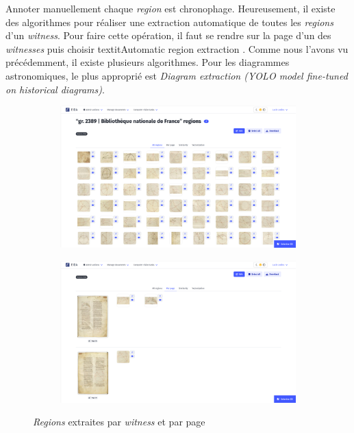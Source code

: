 Annoter manuellement chaque \textit{region} est chronophage. Heureusement, il existe des algorithmes pour réaliser une extraction automatique de toutes les \textit{regions} d'un \textit{witness}. 
Pour faire cette opération, il faut se rendre sur la page d'un des \textit{witnesses} puis choisir \og textit{Automatic region extraction} \fg. Comme nous l'avons vu précédemment, il existe plusieurs algorithmes. Pour les diagrammes astronomiques, le plus approprié est \og \textit{Diagram extraction (YOLO model fine-tuned on historical diagrams)}\fg.


\begin{figure}[h]
	\centering
	\begin{subfigure}{0.48\linewidth}
		\centering
		\includegraphics[width=\linewidth]{images/regions_par_witness.png}
	\end{subfigure}
	\hfill
	\begin{subfigure}{0.48\linewidth}
		\centering
		\includegraphics[width=\linewidth]{images/regions_par_page.png}
	\end{subfigure}
	\caption{\textit{Regions} extraites par \textit{witness} et par page}
	\label{fig:regions_extraction}
\end{figure}


